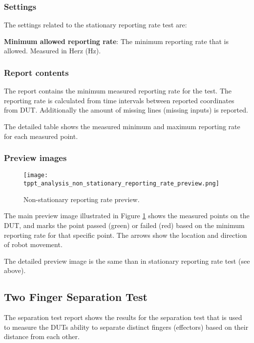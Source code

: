 \subsubsection{Settings}

The settings related to the stationary reporting rate test are:

\textbf{Minimum allowed reporting rate}: The minimum reporting rate that is allowed. Measured in Herz (Hz).

\subsubsection{Report contents}

The report contains the minimum measured reporting rate for the test. The reporting rate is calculated from time intervals between reported coordinates from DUT. Additionally the amount of missing lines (missing inputs) is reported.

The detailed table shows the measured minimum and maximum reporting rate for each measured point. 

\subsubsection{Preview images}

\begin{figure}[!h]
	\centering
	\texttt{[image: tppt\_analysis\_non\_stationary\_reporting\_rate\_preview.png]}
	\caption{Non-stationary reporting rate preview.}
	\label{fig:tppt_analysis_non_stationary_reporting_rate_preview}
\end{figure}

The main preview image illustrated in Figure \ref{fig:tppt_analysis_non_stationary_reporting_rate_preview} shows the measured points on the DUT, and marks the point passed (green) or failed (red) based on the minimum reporting rate for that specific point. The arrows show the location and direction of robot movement.

The detailed preview image is the same than in stationary reporting rate test (see above).

\subsection{Two Finger Separation Test}

The separation test report shows the results for the separation test that is used to measure the DUTs ability to separate distinct fingers (effectors) based on their distance from each other.

